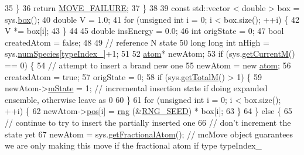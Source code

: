\begin{DoxyCode}
35         \}
36         \textcolor{keywordflow}{return} \hyperlink{moves_8h_a9832cf5fcfa8c0894545b591c9908e39}{MOVE\_FAILURE};
37     \}
38 
39     \textcolor{keyword}{const} std::vector < double > box = sys.\hyperlink{classsim_system_a8bff9dfb95b1b09a0fab2c1c485ade07}{box}();
40     \textcolor{keywordtype}{double} V = 1.0;
41     \textcolor{keywordflow}{for} (\textcolor{keywordtype}{unsigned} \textcolor{keywordtype}{int} i = 0; i < box.size(); ++i) \{
42         V *= box[i];
43     \}
44 
45     \textcolor{keywordtype}{double} insEnergy = 0.0;
46     \textcolor{keywordtype}{int} origState = 0;
47     \textcolor{keywordtype}{bool} createdAtom = \textcolor{keyword}{false};
48 
49     \textcolor{comment}{// reference N state}
50     \textcolor{keywordtype}{long} \textcolor{keywordtype}{long} \textcolor{keywordtype}{int} nHigh = sys.\hyperlink{classsim_system_a9eea865e6dc1cff377b1e79c4d9c23f0}{numSpecies}[\hyperlink{classmc_move_acb731965547b0326ef318ec96da8b46a}{typeIndex\_}]+1;
51 
52         \hyperlink{classatom}{atom}* newAtom;
53         \textcolor{keywordflow}{if} (sys.\hyperlink{classsim_system_a299fe4372e610b554eaaf5f5957b2dbc}{getCurrentM}() == 0) \{
54             \textcolor{comment}{// attempt to insert a brand new one}
55             newAtom = \textcolor{keyword}{new} \hyperlink{classatom}{atom};
56             createdAtom = \textcolor{keyword}{true};
57             origState = 0;
58             \textcolor{keywordflow}{if} (sys.\hyperlink{classsim_system_aa4ad1afff101bb530e1590df05035276}{getTotalM}() > 1) \{
59                 newAtom->\hyperlink{classatom_a3cb00c0c5b7533657e05af6ff4a42740}{mState} = 1; \textcolor{comment}{// incremental insertion state if doing expanded ensemble,
       otherwise leave as 0}
60             \}
61             \textcolor{keywordflow}{for} (\textcolor{keywordtype}{unsigned} \textcolor{keywordtype}{int} i = 0; i < box.size(); ++i) \{
62                 newAtom->\hyperlink{classatom_a3ae5f4880e7831d8b2c9fda72b4eb24a}{pos}[i] = \hyperlink{utilities_8cpp_a0f9542af4b475ac79cb679d7a8d14db0}{rng} (&\hyperlink{global_8h_a3f4e4ea24d5a5c66feae55d1f329c884}{RNG\_SEED}) * box[i];
63             \}
64         \} \textcolor{keywordflow}{else} \{
65             \textcolor{comment}{// continue to try to insert the partially inserted one}
66             \textcolor{comment}{// don't increment the state yet}
67             newAtom = sys.\hyperlink{classsim_system_a2ab77377c60e0e3109a6e875690b0ab7}{getFractionalAtom}(); \textcolor{comment}{// mcMove object guarantees we are only
       making this move if the fractional atom if type typeIndex\_}

\end{DoxyCode}
